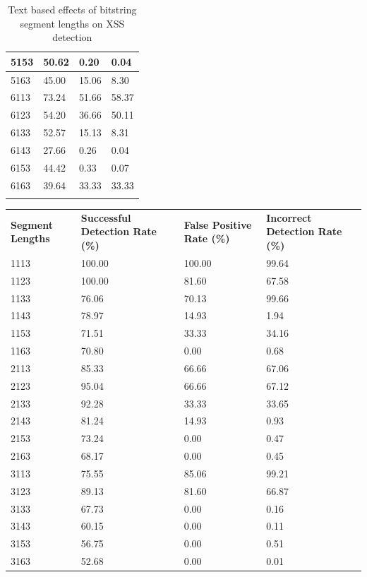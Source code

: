 \begin{appendices}
\begin{longtable}{|p{1.5in}|p{1in}|p{1in}|p{1in}|}
	5153 &  50.62 &   0.20 &   0.04 \\ \hline
	5163 &  45.00 &  15.06 &   8.30 \\ \hline
	6113 &  73.24 &  51.66 &  58.37 \\ \hline
	6123 &  54.20 &  36.66 &  50.11 \\ \hline
	6133 &  52.57 &  15.13 &   8.31 \\ \hline
	6143 &  27.66 &   0.26 &   0.04 \\ \hline
	6153 &  44.42 &   0.33 &   0.07 \\ \hline
	6163 &  39.64 &  33.33 &  33.33 \\ \hline
	\caption{Text based effects of bitstring segment lengths on XSS detection}
\end{longtable}

\begin{longtable}{|p{1.5in}|p{1in}|p{1in}|p{1in}|}
	\hline
	\textbf{Segment Lengths} & \textbf{Successful Detection Rate (\%)} & \textbf{False Positive Rate (\%)} & \textbf{Incorrect Detection Rate (\%)}  \\
	\hhline{|=|=|=|=|}
	1113 & 100.00 & 100.00 & 99.64 \\ \hline
	1123 & 100.00 &  81.60 & 67.58 \\ \hline
	1133 &  76.06 &  70.13 & 99.66 \\ \hline
	1143 &  78.97 &  14.93 &  1.94 \\ \hline
	1153 &  71.51 &  33.33 & 34.16 \\ \hline
	1163 &  70.80 &   0.00 &  0.68 \\ \hline
	2113 &  85.33 &  66.66 & 67.06 \\ \hline
	2123 &  95.04 &  66.66 & 67.12 \\ \hline
	2133 &  92.28 &  33.33 & 33.65 \\ \hline
	2143 &  81.24 &  14.93 &  0.93 \\ \hline
	2153 &  73.24 &   0.00 &  0.47 \\ \hline
	2163 &  68.17 &   0.00 &  0.45 \\ \hline
	3113 &  75.55 &  85.06 & 99.21 \\ \hline
	3123 &  89.13 &  81.60 & 66.87 \\ \hline
	3133 &  67.73 &   0.00 &  0.16 \\ \hline
	3143 &  60.15 &   0.00 &  0.11 \\ \hline
	3153 &  56.75 &   0.00 &  0.51 \\ \hline
	3163 &  52.68 &   0.00 &  0.01 \\ \hline

\end{longtable}
\end{appendices}
